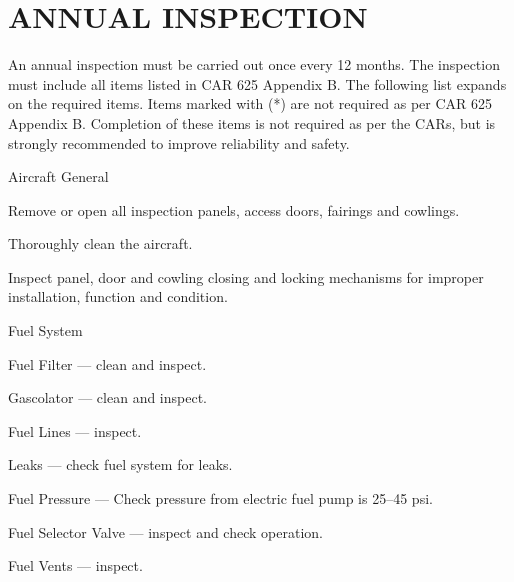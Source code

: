 \section{ANNUAL INSPECTION} An annual inspection must be carried out once every 12 months.  The inspection must include all items listed in CAR 625 Appendix B.  The following list expands on the required items.  Items marked with (*) are not required as per CAR 625 Appendix B.  Completion of these items is not required as per the CARs, but is strongly recommended to improve reliability and safety.

\begin{enumerate*}
  \item{Aircraft General}
  \begin{enumerate*}
    \item Remove or open all inspection panels, access doors, fairings and cowlings.
    \item Thoroughly clean the aircraft.
    \item Inspect panel, door and cowling closing and locking mechanisms for improper installation, function and condition.
		\end{enumerate*}

	\item{Fuel System} 
	\begin{enumerate*}
		\item Fuel Filter --- clean and inspect. 
		\item Gascolator --- clean and inspect. 
		\item Fuel Lines --- inspect.
		\item Leaks --- check fuel system for leaks.
		\item Fuel Pressure --- Check pressure from electric fuel pump is 25--45 psi. 
		\item Fuel Selector Valve --- inspect and check operation.
		\item Fuel Vents --- inspect.
	\end{enumerate*}



\end{enumerate*}
